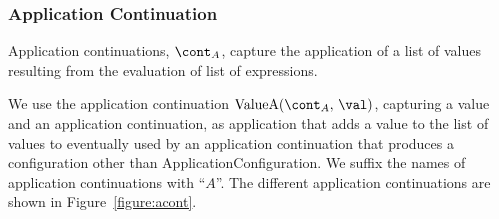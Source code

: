 \documentclass[a4paper,oneside,fleqn]{article}
\newcommand{\idmeta}{\ensuremath{\mathit{X}}}
\begin{document}
\subsubsection{Application Continuation}
\label{subsubsec:application-continuation}

Application continuations, $\acont$, capture the application of a list of values resulting from the evaluation of list of expressions.

\newcommand{\ValueA}[2]{\mathrm{ValueA}({#1},\,{#2})}
\newcommand{\StringConcatenationA}{\mathrm{StringConcatenationA(\econt)}}
\newcommand{\SuperMethodA}[1]{\mathrm{SuperMethodA}(\idmeta,\,\env,\,#1,\,\ExceptionHandlersRest,\,\econt)}
\newcommand{\StaticInvA}[4]{\mathrm{StaticInvocationA}({#1},\,{#2},\,{#3},\,\ExceptionHandlersRest,\,{#4})}
\newcommand{\DInstanceMethodA}{\mathrm{DInstanceMethodA}(\membermeta,\,\val,\,\ExceptionHandlers,\,\econt)}
\newcommand{\FieldsA}[4]{\mathrm{InstanceFieldsA}({#1},\,{#2},\,{#3},\,\strace,\,\handler,\,\cstrace,\,\cex,\,{#4})}
\newcommand{\SuperA}[3]{\mathrm{SuperA}({#1},\,{#2},\,\strace,\,\handler,\,\cstrace,\,\cex,\,{#3})}
\newcommand{\ConstructorA}[3]{\mathrm{ConstructorA}({#1},\,{#2},\,\handler,\,\cstrace,\,\cex,\,{#3})}
\newcommand{\RedirectingA}[3]{\mathrm{RedirectingA}({#1},\,{#2},\,\strace,\,\handler,\,\cstrace,\,\cex,\,{#3})}
\newcommand{\ForInitA}[1]{\mathrm{ForInitA}(\mathrm{\varmeta{s}},\, #1,\, \exprs,\, \statementmeta,\, \env,\, \lbls,\, \clbls,\, \handler,\, \cstrace,\, \cex,\, \econt,\, \scont)}
\newcommand{\ForUpdatesA}[2]{\mathrm{ForUpdatesA}(\mathrm{\varmeta{s}},\, #1,\, \exprs,\, \statementmeta,\, \env,\, #2,\, \lbls,\, \clbls,\, \handler,\, \cstrace,\, \cex,\, \econt,\, \scont)}
\newcommand{\InstanceMethodA}{\mathrm{InstanceMethodA}(\idmeta,\,\val,\,\strace,\,\handler,\,\cstrace,\,\cex,\,\econt)}

We use the application continuation $\ValueA{\acont}{\val}$, capturing a value and an application continuation, as application that adds a value to the list of values to eventually used by an application continuation that produces a configuration other than ApplicationConfiguration.
We suffix the names of application continuations with ``$A$''.
The different application continuations are shown in Figure~\ref{figure:acont}.
\end{document}
